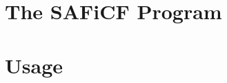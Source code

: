 \documentclass[12pt,onecolumn,tightenlines,aps,amsmath,floatfix,notitlepage,nofootinbib]{revtex4}
\begin{document}


\section{The SAFiCF Program} \label{sec-prog}









\section{Usage} \label{sec-use}
\end{document}
